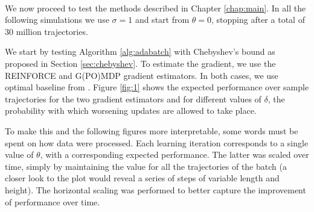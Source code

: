 \paragraph{}
We now proceed to test the methods described in Chapter \ref{chap:main}. 
In all the following simulations we use $\sigma = 1$ and start from $\theta=0$, stopping after a total of 30 million trajectories.

We start by testing Algorithm \ref{alg:adabatch} with Chebyshev's bound as proposed in Section \ref{sec:chebyshev}. To estimate the gradient, we use the REINFORCE and G(PO)MDP gradient estimators. In both cases, we use optimal baseline from \cite{4867}.
Figure \ref{fig:1} shows the expected performance over sample trajectories for the two gradient estimators and for different values of $\delta$, the probability with which worsening updates are allowed to take place.

 To make this and the following figures more interpretable, some words must be spent on how data were processed. Each learning iteration corresponds to a single value of $\theta$, with a corresponding expected performance. The latter was scaled over time, simply by maintaining the value for all the trajectories of the batch (a closer look to the plot would reveal a series of steps of variable length and height). The horizontal scaling was performed to better capture the improvement of performance over time.


